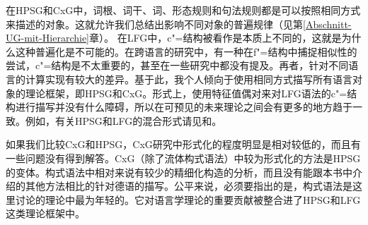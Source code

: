 在HPSG和CxG中，词根、词干、词、形态规则和句法规则都是可以按照相同方式来描述的对象。这就允许我们总结出影响不同对象的普遍规律（见第\ref{Abschnitt-UG-mit-Hierarchie}章）。
在LFG中，c"=结构被看作是本质上不同的，这就是为什么这种普遍化是不可能的。在跨语言的研究中，有一种在f"=结构中捕捉相似性的尝试，c"=结构是不太重要的，甚至在一些研究中都没有提及。再者，针对不同语言的计算实现有较大的差异。基于此，我个人倾向于使用相同方式描写所有语言对象的理论框架，即HPSG和CxG。形式上，使用特征值偶对来对LFG语法的c"=结构进行描写并没有什么障碍，所以在可预见的未来理论之间会有更多的地方趋于一致。例如，有关HPSG和LFG的混合形式请见和。

如果我们比较CxG和HPSG，CxG研究中形式化的程度明显是相对较低的，而且有一些问题没有得到解答。CxG（除了流体构式语法）中较为形式化的方法是HPSG的变体。构式语法中相对来说有较少的精细化构造的分析，而且没有能跟本书中介绍的其他方法相比的针对德语的描写。公平来说，必须要指出的是，构式语法是这里讨论的理论中最为年轻的。它对语言学理论的重要贡献被整合进了HPSG和LFG这类理论框架中。

